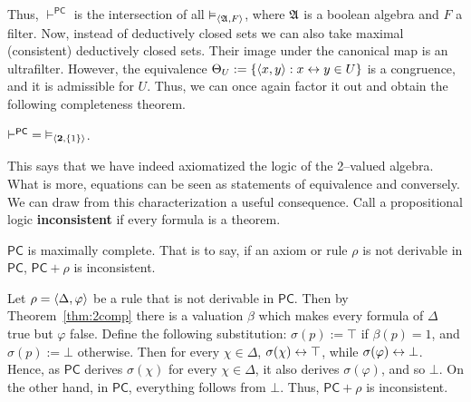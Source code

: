 Thus, $\vdash^{\mathsf{PC}}$ is the intersection of all
$\vDash_{\langle \mathfrak{A}, F\rangle}$, where $\mathfrak{A}$ is a boolean algebra and
$F$ a filter. Now, instead of deductively closed sets we can also
take maximal (consistent) deductively closed sets. Their image
under the canonical map is an ultrafilter. However, the
equivalence $\Theta_U := \{\langle x, y\rangle : x \leftrightarrow y \in U\}$ is a 
congruence, and it is admissible for $U$. Thus, we can once again 
factor it out and obtain the following completeness theorem.
\begin{thm}
\label{thm:2comp} 
$\vdash^{\mathsf{PC}}\; = \; \vDash_{\langle \boldsymbol{2}, \{1\}\rangle}$.
\end{thm}
This says that we have indeed axiomatized the logic of the
2--valued algebra. What is more, equations can be seen as
statements of equivalence and conversely. We can draw from
this characterization a useful consequence. Call a propositional
logic \textbf{inconsistent} if every formula is a theorem.
\begin{cor}
$\mathsf{PC}$ is maximally complete. That is to say, if an
axiom or rule $\rho$ is not derivable in $\mathsf{PC}$,
$\mathsf{PC} + \rho$ is inconsistent.
\end{cor}
\proofbeg
Let $\rho = \langle \Delta, \varphi\rangle$ be a rule that is not derivable
in $\mathsf{PC}$. Then by Theorem~\ref{thm:2comp} there is a valuation
$\beta$ which makes every formula of $\Delta$ true but $\varphi$ false.
Define the following substitution: $\sigma(p) := \top$ if
$\beta(p) = 1$, and $\sigma(p) := \bot$ otherwise. Then for
every $\chi \in \Delta$, $\sigma(\chi) \leftrightarrow \top$, while
$\sigma(\varphi) \leftrightarrow \bot$. Hence, as $\mathsf{PC}$ derives
$\sigma(\chi)$ for every $\chi \in \Delta$, it also derives
$\sigma(\varphi)$, and so $\bot$. On the other hand,
in $\mathsf{PC}$, everything follows from $\bot$. Thus,
$\mathsf{PC} + \rho$ is inconsistent.
\proofend

